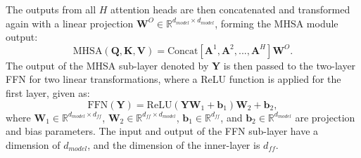 \documentclass[journal]{IEEEtran}
\begin{document}
The outputs from all $H$ attention heads are then concatenated and transformed again with a linear projection $\textbf{W}^{O}\!\in\!\mathbb{R}^{d_{model}\times d_{model}}$, forming the MHSA module output:
\begin{equation}
    \text{MHSA}\left(\textbf{Q}, \textbf{K}, \textbf{V}\right) = \text{Concat}[\textbf{A}^{1}\!,\textbf{A}^{2}\!,...,\textbf{A}^{H}]\textbf{W}^{O}.
\end{equation}
The output of the MHSA sub-layer denoted by $\textbf{Y}$ is then passed to the two-layer FFN for two linear transformations, where a ReLU function is applied for the first layer, given as:
\begin{equation}
    \text{FFN}(\textbf{Y}) = \text{ReLU}(\textbf{Y}\textbf{W}_{1} + \textbf{b}_{1})\textbf{W}_{2} + \textbf{b}_{2},
\end{equation}
where $\textbf{W}_{1}\in \mathbb{R}^{d_{model}\times d_{f\!f}}$, $\textbf{W}_{2}\in \mathbb{R}^{d_{f\!f}\times d_{model}}$, $\textbf{b}_{1}\in \mathbb{R}^{d_{f\!f}}$, and $\textbf{b}_{2}\in \mathbb{R}^{d_{model}}$ are projection and bias parameters. The input and output of the FFN sub-layer have a dimension of $d_{model}$, and the dimension of the inner-layer is $d_{f\!f}$.





\end{document}
